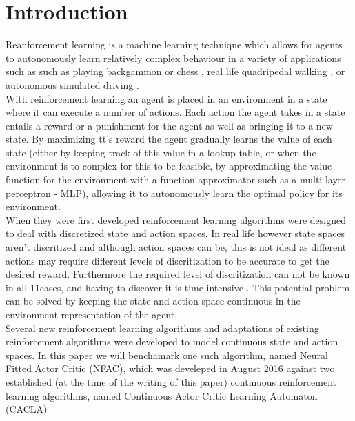 
\section{Introduction}

Reanforcement learning is a machine learning technique which allows for agents to autonomously learn relatively complex behaviour
in a variety of applications such as such as playing backgammon \cite{tesauro2002programming} or chess \cite{baxter1999knightcap},
real life quadripedal walking \cite{kohl2004policy}, or autonomous simulated driving \cite{}. \\

With reinforcement learning an agent is placed in an environment in a state where it can execute a number of actions. Each
action the agent takes in a state entails a reward or a punishment for the agent as well as bringing it to a new state.
By maximizing tt's reward the agent gradually learns the value of each state (either by keeping track of this value in a
lookup table, or when the environment is to complex for this to be feasible, by approximating the value function for the
environment with a function approximator such as a multi-layer perceptron - MLP), allowing it to autonomously learn the optimal policy
for its environment. \\
When they were first developed reinforcement learning algorithms were designed to deal with discretized state and action
spaces. In real life however state spaces aren't discritized and although action spaces can be, this is not ideal as different
actions may require different levels of discritization to be accurate to get the desired reward. Furthermore the required level
of discritization can not be known in all 11cases, and having to discover it is time intensive \cite{van2007reinforcement}. %
This potential problem can be solved by keeping the state and action space continuous in the environment representation of the agent. \\
Several new reinforcement learning algorithms and adaptations of existing reinforcement algorithms were developed to model continuous
state and action spaces. In this paper we will benchamark one such algorithm, named Neural Fitted Actor Critic (NFAC), which was develeped in August 2016 \cite{zimmer2016neural}
against two established (at the time of the writing of this paper) continuous reinforcement learning algorithms, named Continuous Actor Critic Learning Automaton (CACLA)
